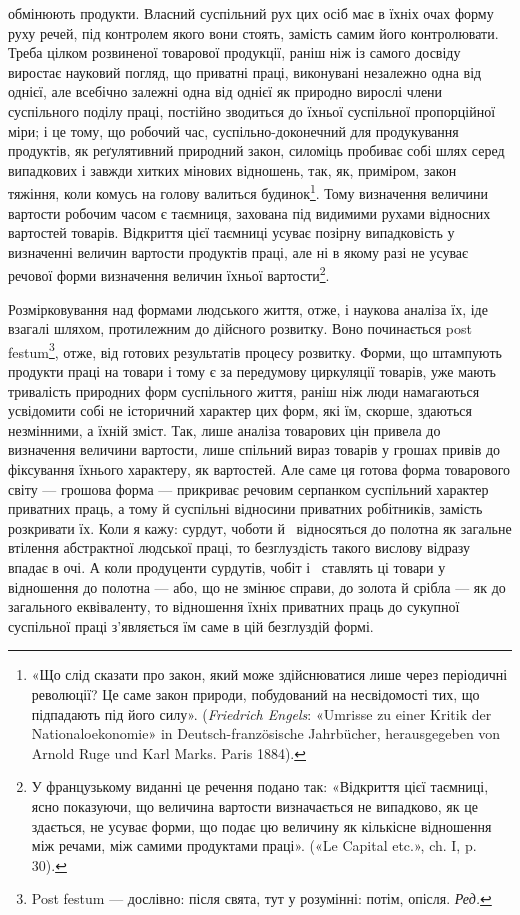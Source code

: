 \parcont{}  %
обмінюють продукти. Власний суспільний рух цих осіб має в
їхніх очах форму руху речей, під контролем якого вони стоять,
замість самим його контролювати. Треба цілком розвиненої товарової
продукції, раніш ніж із самого досвіду виростає науковий
погляд, що приватні праці, виконувані незалежно одна від однієї,
але всебічно залежні одна від однієї як природно вирослі члени
суспільного поділу праці, постійно зводиться до їхньої суспільної
пропорційної міри; і це тому, що робочий час, суспільно-доконечний
для продукування продуктів, як реґулятивний природний
закон, силоміць пробиває собі шлях серед випадкових і завжди
хитких мінових відношень, так, як, приміром, закон тяжіння,
коли комусь на голову валиться будинок\footnote{
«Що слід сказати про закон, який може здійснюватися лише
через періодичні революції? Це саме закон природи, побудований на
несвідомості тих, що підпадають під його силу». (\emph{Friedrich Engels}: «Umrisse
zu einer Kritik der Nationaloekonomie» in Deutsch-französische
Jahrbücher, herausgegeben von Arnold Ruge und Karl Marks. Paris 1884).
}. Тому визначення
величини вартости робочим часом є таємниця, захована під видимими
рухами відносних вартостей товарів. Відкриття цієї таємниці
усуває позірну випадковість у визначенні величин вартости
продуктів праці, але ні в якому разі не усуває речової форми визначення
величин їхньої вартости\footnote*{
У французькому виданні це речення подано так: «Відкриття цієї
таємниці, ясно показуючи, що величина вартости визначається не випадково,
як це здається, не усуває форми, що подає цю величину як кількісне
відношення між речами, між самими продуктами праці». («Le Capital
etc.», ch. I, p. 30).
}.

Розмірковування над формами людського життя, отже, і наукова
аналіза їх, іде взагалі шляхом, протилежним до дійсного
розвитку. Воно починається post festum\footnote*{
Post festum — дослівно: після свята, тут у розумінні: потім,
опісля. \emph{Ред.}
}, отже, від готових результатів
процесу розвитку. Форми, що штампують продукти
праці на товари і тому є за передумову циркуляції товарів, уже
мають тривалість природних форм суспільного життя, раніш ніж
люди намагаються усвідомити собі не історичний характер цих
форм, які їм, скорше, здаються незмінними, а їхній зміст. Так,
лише аналіза товарових цін привела до визначення величини вартости,
лише спільний вираз товарів у грошах привів до фіксування
їхнього характеру, як вартостей. Але саме ця готова форма
товарового світу — грошова форма — прикриває речовим серпанком
суспільний характер приватних праць, а тому й суспільні
відносини приватних робітників, замість розкривати їх. Коли я
кажу: сурдут, чоботи й~ відносяться до полотна як загальне
втілення абстрактної людської праці, то безглуздість такого
вислову відразу впадає в очі. А коли продуценти сурдутів, чобіт
і~ ставлять ці товари у відношення до полотна — або, що не
змінює справи, до золота й срібла — як до загального еквіваленту,
то відношення їхніх приватних праць до сукупної суспільної
праці з’являється їм саме в цій безглуздій формі.
